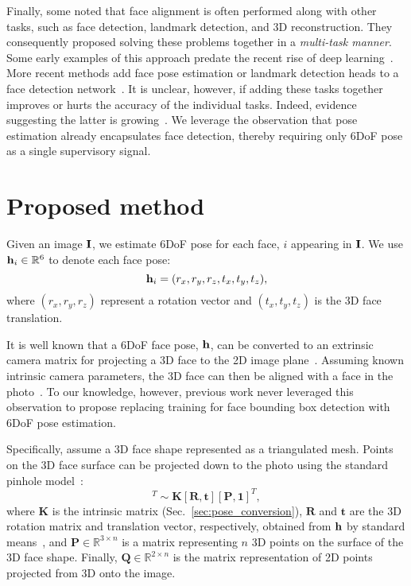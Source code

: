 \documentclass[final]{cvpr}
\begin{document}
Finally, some noted that face alignment is often performed along with other tasks, such as face detection, landmark detection, and 3D reconstruction. They consequently proposed solving these problems together in a {\em multi-task manner}. Some early examples of this approach predate the recent rise of deep learning~\cite{osadchy2007synergistic,osadchy2004synergistic}. More recent methods add face pose estimation or landmark detection heads to a face detection network~\cite{chang2019deep, kepler, hyperface, ranjan2017all, zhu2012face}. It is unclear, however, if adding these tasks together improves or hurts the accuracy of the individual tasks. Indeed, evidence suggesting the latter is growing~\cite{lu2017fully,tran2019transferability,zhao2018modulation}. We leverage the observation that pose estimation already encapsulates face detection, thereby requiring only 6DoF pose as a single supervisory signal.



\section{Proposed method}\label{sec:method}
Given an image ${\bf I}$, we estimate 6DoF pose for each face, $i$ appearing in ${\bf I}$. We use ${{\bf{h}}_i}\in\mathbb{R}^6$ to denote each face pose: 
\begin{equation}
{{\bf{h}}_i} = (r_x, r_y, r_z, t_x, t_y, t_z),\label{eq:pose}
\end{equation}
where $(r_x, r_y, r_z)$ represent a rotation vector \cite{trucco1998introductory} and $(t_x, t_y, t_z)$ is the 3D face translation.

It is well known that a 6DoF face pose, $\bf{h}$, can be converted to an extrinsic camera matrix for projecting a 3D face to the 2D image plane~\cite{forsyth2002computer,szeliski2010computer}. Assuming known intrinsic camera parameters, the 3D face can then be aligned with a face in the photo~\cite{hassner2013viewing,hassner2015effective}. To our knowledge, however, previous work never leveraged this observation to propose replacing training for face bounding box detection with 6DoF pose estimation. 


Specifically, assume a 3D face shape represented as a triangulated mesh. Points on the 3D face surface can be projected down to the photo using the standard pinhole model~\cite{hartley2003multiple}:
\begin{equation}
[\mathbf{Q}, \mathbf{1}]^T 	\sim \mathbf{K}[\mathbf{R}, \mathbf{t}][\mathbf{P}, \mathbf{1}]^T,
\label{eqn:proj}
\end{equation}
 where $\mathbf{K}$ is the intrinsic matrix (Sec.~\ref{sec:pose_conversion}), $\mathbf{R}$ and $\mathbf{t}$ are the 3D rotation matrix and translation vector, respectively, obtained from $\bf{h}$ by standard means~\cite{forsyth2002computer,szeliski2010computer}, and $\mathbf{P} \in \mathbb{R}^{3 \times n}$ is a matrix representing $n$ 3D points on the surface of the 3D face shape. Finally, $\mathbf{Q} \in \mathbb{R}^{2 \times n}$ is the matrix representation of 2D points projected from 3D onto the image. 
\end{document}
